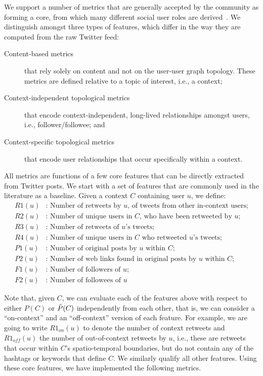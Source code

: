 \documentclass[runningheads]{llncs}
\begin{document}
We support a number of metrics that are generally accepted by the community as forming a core, from which many different social user roles are derived~\cite{RIQUELME2016949}. 
We distinguish amongst three types of features, which differ in the way they are computed from the raw Twitter feed:
\begin{description}
	\item[Content-based metrics] that rely solely on content and not on the user-user graph topology. These metrics are defined relative to a topic of interest, i.e., a context;
	\item[Context-independent topological metrics] that encode context-independent, long-lived relationships amongst users, i.e., follower/followee; and 
	\item[Context-specific topological metrics] that encode user relationships that occur specifically within a context.
\end{description}

All metrics are functions of a few core features that can be directly extracted from Twitter posts. 
We start with a set of features that are commonly used in the literature as a baseline.
Given a context $C$ containing user $u$, we define:
%
\begin{align*}
\mathit{R1}(u) &\text{: Number of retweets by $u$, of tweets from other in-context users;}\\
\mathit{R2}(u)&\text{: Number of unique users in $C$, who have been retweeted by $u$;}\\
\mathit{R3}(u)&\text{: Number of retweets of $u$'s tweets;}\\
\mathit{R4}(u)&\text{: Number of unique users in $C$ who retweeted $u$'s tweets;}\\
\mathit{P1}(u)&\text{: Number of original posts by $u$ within $C$;}\\
\mathit{P2}(u)&\text{: Number of web links found in original posts by $u$ within $C$;} \\
\mathit{F1}(u)& \text{: Number of followers of $u$;}\\
\mathit{F2}(u)& \text{: Number of followees of $u$}
\end{align*}
%

Note that, given $C$, we can evaluate each of the features above with respect to either $P(C)$ or  $\Tilde{P}(C)$ independently from each other, that is, we can consider a ``on-context'' and an ``off-context'' version of each feature.
%
For example, we are going to write $R1_{on}(u)$ to denote the number of context retweets and $R1_{\mathit{off}}(u)$ the number of out-of-context retweets by $u$, i.e., these are retweets that occur within $C$'s spatio-temporal boundaries, but do not contain any of the hashtags or keywords that define $C$.  
%
We similarly qualify all other features.
%
Using these core features, we have implemented the following metrics.
\end{document}
